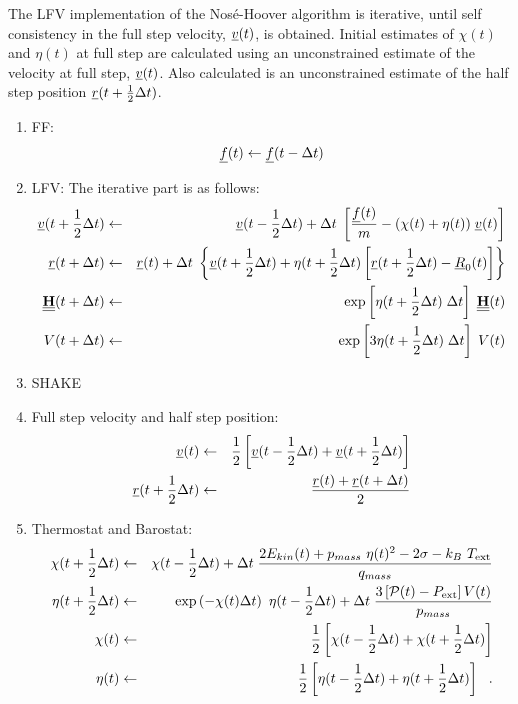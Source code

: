 The LFV implementation of the Nos\'{e}-Hoover algorithm is iterative,
until self consistency in the full step velocity, $\mbox{$\underline{v}$}(t)$,
is obtained.  Initial estimates of $\chi (t)$ and $\eta (t)$ at
full step are calculated using an unconstrained estimate of the
velocity at full step, $\mbox{$\underline{v}$}(t)$.  Also calculated is an unconstrained
estimate of the half step position $\mbox{$\underline{r}$}(t + {1 \over 2} \Delta t)$.
\begin{enumerate}
\item FF:
\begin{equation}
\mbox{$\underline{f}$}(t) \leftarrow \mbox{$\underline{f}$}(t - \Delta t)
\end{equation}
\item LFV: The iterative part is as follows:
\begin{eqnarray}
\mbox{$\underline{v}$}(t + {1 \over 2} \Delta t) &\leftarrow& \mbox{$\underline{v}$}(t - {1 \over 2} \Delta t) + \Delta t \;
\left[{\mbox{$\underline{f}$}(t) \over m} - (\chi (t) + \eta (t)) \; \mbox{$\underline{v}$}(t) \right] \nonumber \\
\mbox{$\underline{r}$}(t + \Delta t) &\leftarrow& \mbox{$\underline{r}$}(t) + \Delta t \;
\left\{ \mbox{$\underline{v}$}(t + {1 \over 2} \Delta t) + \eta (t + {1 \over 2} \Delta t) \left[
\mbox{$\underline{r}$}(t + {1 \over 2} \Delta t) - \mbox{$\underline{R}$}_{0}(t) \right] \right\} \nonumber \\
\mbox{$\underline{\underline{\bf H}}$}(t + \Delta t) &\leftarrow& \exp \left[ \eta (t + {1 \over 2} \Delta t) \;
\Delta t \right] \; \mbox{$\underline{\underline{\bf H}}$}(t) \\
V(t + \Delta t) &\leftarrow& \exp \left[3 \eta (t + {1 \over 2} \Delta t) \;
\Delta t \right] \; V(t) \nonumber
\end{eqnarray}
\item SHAKE \item Full step velocity and half step position:
\begin{eqnarray}
\mbox{$\underline{v}$}(t) &\leftarrow& {1 \over 2} \left[ \mbox{$\underline{v}$}(t - {1 \over 2} \Delta t) +
\mbox{$\underline{v}$}(t + {1 \over 2} \Delta t) \right] \nonumber \\
\mbox{$\underline{r}$}(t + {1 \over 2} \Delta t) &\leftarrow& \frac{\mbox{$\underline{r}$}(t) + \mbox{$\underline{r}$}(t + \Delta t)}{2}
\end{eqnarray}
\item Thermostat and Barostat:
\begin{eqnarray}
\chi (t + {1 \over 2} \Delta t) &\leftarrow& \chi (t - {1 \over 2} \Delta t) + \Delta t \;
{{2 E_{kin}(t) + p_{mass}~\eta (t)^{2} - 2 \sigma - k_{B}~T_{\rm ext}} \over q_{mass}} \nonumber \\
\eta (t + {1 \over 2} \Delta t) &\leftarrow& \exp \left( -\chi (t) \Delta t \right) ~
\eta (t - {1 \over 2} \Delta t) + \Delta t \;
{3 \left[ {\cal P}(t) - P_{\rm ext} \right] V(t) \over p_{mass}} \nonumber \\
\chi (t) &\leftarrow& {1 \over 2} \left[ \chi (t - {1 \over 2} \Delta t) +
\chi (t + {1 \over 2} \Delta t) \right] \\
\eta (t) &\leftarrow& {1 \over 2} \left[ \eta (t - {1 \over 2} \Delta t) +
\eta (t + {1 \over 2} \Delta t) \right]~~. \nonumber
\end{eqnarray}
\end{enumerate}
